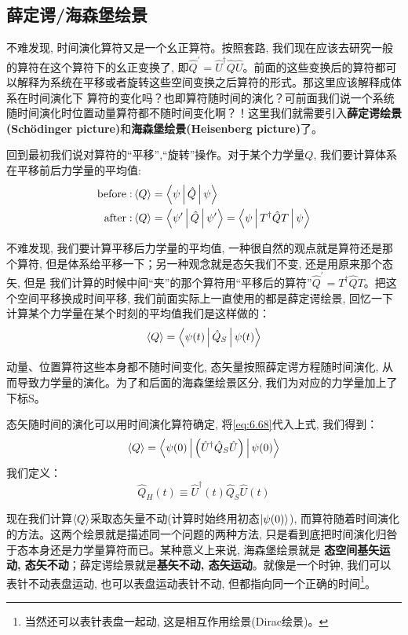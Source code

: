 \subsection{薛定谔/海森堡绘景}
不难发现, 时间演化算符又是一个幺正算符。按照套路, 我们现在应该去研究一般的算符在这个算符下的幺正变换了, 即$\hat Q^\prime=\hat{U}^\dagger\hat{Q}\hat{U}$。前面的这些变换后的算符都可以解释为系统在平移或者旋转这些空间变换之后算符的形式。那这里应该解释成体系在时间演化下
算符的变化吗？也即算符随时间的演化？可前面我们说一个系统随时间演化时位置动量算符都不随时间变化啊？！这里我们就需要引入\textbf{薛定谔绘景(Sch\"odinger picture)}和\textbf{海森堡绘景(Heisenberg picture)}了。

回到最初我们说对算符的“平移”,“旋转”操作。对于某个力学量$Q$, 我们要计算体系在平移前后力学量的平均值:
\begin{align*}
    \text{before}:&\braket{Q}=\Braket{\psi|\hat{Q}|\psi}\\
    \text{after}:&\braket{Q}=\Braket{\psi^\prime|\hat{Q}|\psi^\prime}=\Braket{\psi|T^\dagger\hat{Q}T|\psi}
\end{align*}

不难发现, 我们要计算平移后力学量的平均值, 一种很自然的观点就是算符还是那个算符, 但是体系给平移一下；另一种观念就是态矢我们不变, 还是用原来那个态矢, 但是
我们计算的时候中间“夹”的那个算符用“平移后的算符”$\hat{Q}^\prime=T^\dagger\hat{Q}T$。把这个空间平移换成时间平移, 我们前面实际上一直使用的都是薛定谔绘景, 
回忆一下计算某个力学量在某个时刻的平均值我们是这样做的：
\[\braket{Q}=\Braket{\psi(t)|\hat{Q}_S|\psi(t)}\]

动量、位置算符这些本身都不随时间变化, 态矢量按照薛定谔方程随时间演化, 从而导致力学量的演化。为了和后面的海森堡绘景区分, 我们为对应的力学量加上了下标S。

态矢随时间的演化可以用时间演化算符确定, 将\ref{eq:6.68}代入上式, 我们得到：
\[\braket{Q}=\Braket{\psi(0)|\left(\hat{U}^\dagger\hat{Q}_S\hat{U}\right)|\psi(0)}\]
我们定义：
\begin{equation}
    \label{eq:6.71}
    \hat{Q}_H(t)\equiv\hat{U}^\dagger(t)\hat{Q}_S\hat{U}(t)
\end{equation}

现在我们计算$\braket{Q}$采取态矢量不动(计算时始终用初态$\ket{\psi(0)}$), 而算符随着时间演化的方法。这两个绘景就是描述同一个问题的两种方法, 只是看到底把时间演化归咎于态本身还是力学量算符而已。某种意义上来说, 海森堡绘景就是
\textbf{态空间基矢运动, 态矢不动}；薛定谔绘景就是\textbf{基矢不动, 态矢运动}。就像是一个时钟, 我们可以表针不动表盘运动, 也可以表盘运动表针不动, 但都指向同一个正确的时间\footnote{当然还可以表针表盘一起动, 这是相互作用绘景(Dirac绘景)。}。


